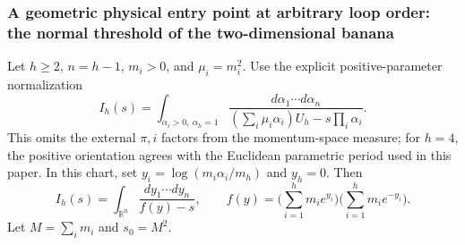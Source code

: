 \documentclass[11pt,a4paper,oneside]{article}
\theoremstyle{plain}
\theoremstyle{definition}
\theoremstyle{remark}
\numberwithin{equation}{section}
\begin{document}
\subsubsection{A geometric physical entry point at arbitrary loop order: the normal threshold of the two-dimensional banana}
Let $h\ge2$, $n=h-1$, $m_i>0$, and $\mu_i=m_i^2$.
Use the explicit positive-parameter normalization
\[
 I_h(s)=\int_{\alpha_i>0,\ \alpha_h=1}
 \frac{d\alpha_1\cdots d\alpha_n}
 {(\sum_i\mu_i\alpha_i)U_h-s\prod_i\alpha_i}.
\]
This omits the external $\pi,i$ factors from the momentum-space measure;
for $h=4$, the positive orientation agrees with the Euclidean parametric period used in this paper.
In this chart, set $y_i=\log(m_i\alpha_i/m_h)$ and $y_h=0$. Then
\[
 I_h(s)=\int_{\mathbb R^n}\frac{dy_1\cdots dy_n}{f(y)-s},
 \qquad
 f(y)=\Big(\sum_{i=1}^h m_i e^{y_i}\Big)
       \Big(\sum_{i=1}^h m_i e^{-y_i}\Big).
\]
Let $M=\sum_i m_i$ and $s_0=M^2$.
\end{document}
